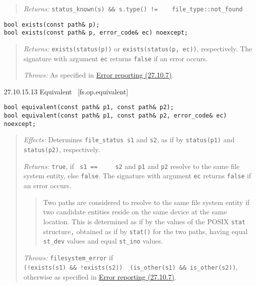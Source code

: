 \begin{quote}
\emph{Returns:}
\texttt{status\_known(s)\ \&\&\ s.type()\ !=\ \ \ \ file\_type::not\_found}
\end{quote}

\begin{verbatim}
bool exists(const path& p);
bool exists(const path& p, error_code& ec) noexcept;
\end{verbatim}

\begin{quote}
\emph{Returns:} \texttt{exists(status(p))} or
\texttt{exists(status(p,\ ec))}, respectively. The signature with
argument \texttt{ec} returns \texttt{false} if an error occurs.

\emph{Throws:} As specified in \hyperref[Error-reporting]{Error
reporting (27.10.7)}.
\end{quote}

27.10.15.13 Equivalent~ {[}fs.op.equivalent{]}

\begin{verbatim}
bool equivalent(const path& p1, const path& p2);
bool equivalent(const path& p1, const path& p2, error_code& ec) noexcept;
\end{verbatim}

\begin{quote}
\emph{Effects:} Determines \texttt{file\_status\ s1} and \texttt{s2}, as
if by \texttt{status(p1)} and~ \texttt{status(p2)}, respectively.

\emph{Returns:} \texttt{true}, if \texttt{\ s1\ ==\ \ \ \ \ s2} and
\texttt{p1} and \texttt{p2} resolve to the same file system entity, else
\texttt{false}. The signature with argument \texttt{ec} returns
\texttt{false} if an error occurs.

\begin{quote}
Two paths are considered to resolve to the same file system entity if
two candidate entities reside on the same device at the same location.
This is determined as if by the values of the POSIX \texttt{stat}
structure\texttt{,} obtained as if by \texttt{stat()} for the two paths,
having equal \texttt{st\_dev} values and equal \texttt{st\_ino} values.
\end{quote}

\emph{Throws:} \texttt{filesystem\_error} if
\texttt{(!exists(s1)\ \&\&\ !exists(s2))\ \textbar{}\textbar{}\ (is\_other(s1)\ \&\&\ is\_other(s2))},
otherwise as specified in \hyperref[Error-reporting]{Error reporting
(27.10.7)}.
\end{quote}

